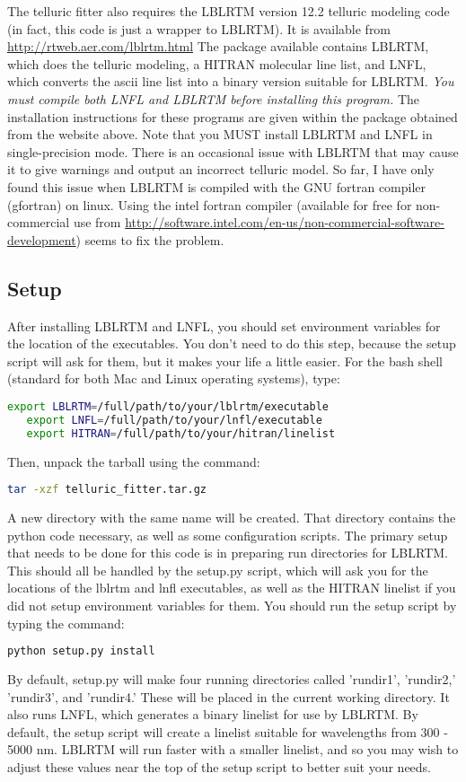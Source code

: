 \documentclass{article}
\begin{document}
The telluric fitter also requires the LBLRTM version 12.2 telluric modeling code (in fact, this code is just a wrapper to LBLRTM). It is available from \url{http://rtweb.aer.com/lblrtm.html} The package available contains LBLRTM, which does the telluric modeling, a HITRAN molecular line list, and LNFL, which converts the ascii line list into a binary version suitable for LBLRTM. \emph{You must compile both LNFL and LBLRTM before installing this program.} The installation instructions for these programs are given within the package obtained from the website above. Note that you MUST install LBLRTM and LNFL in single-precision mode. There is an occasional issue with LBLRTM that may cause it to give warnings and output an incorrect telluric model. So far, I have only found this issue when LBLRTM is compiled with the GNU fortran compiler (gfortran) on linux. Using the intel fortran compiler (available for free for non-commercial use from \url{http://software.intel.com/en-us/non-commercial-software-development}) seems to fix the problem.


\subsection{Setup}
\label{sec:setup}
After installing LBLRTM and LNFL, you should set environment variables for the location of the executables. You don't need to do this step, because the setup script will ask for them, but it makes your life a little easier. For the bash shell (standard for both Mac and Linux operating systems), type:
\begin{lstlisting}[language=bash]
   export LBLRTM=/full/path/to/your/lblrtm/executable 
   export LNFL=/full/path/to/your/lnfl/executable 
   export HITRAN=/full/path/to/your/hitran/linelist
\end{lstlisting}

Then, unpack the tarball using the command:
\begin{lstlisting}[language=bash]
   tar -xzf telluric_fitter.tar.gz
\end{lstlisting}
A new directory with the same name will be created. That directory contains the python code necessary, as well as some configuration scripts. The primary setup that needs to be done for this code is in preparing run directories for LBLRTM. This should all be handled by the setup.py script, which will ask you for the locations of the lblrtm and lnfl executables, as well as the HITRAN linelist if you did not setup environment variables for them. You should run the setup script by typing the command:
\begin{lstlisting}[language=bash]
   python setup.py install
\end{lstlisting}
By default, setup.py will make four running directories called 'rundir1', 'rundir2,' 'rundir3', and 'rundir4.' These will be placed in the current working directory.  It also runs LNFL, which generates a binary linelist for use by LBLRTM. By default, the setup script will create a linelist suitable for wavelengths from 300 - 5000 nm. LBLRTM will run faster with a smaller linelist, and so you may wish to adjust these values near the top of the setup script to better suit your needs.
\end{document}
